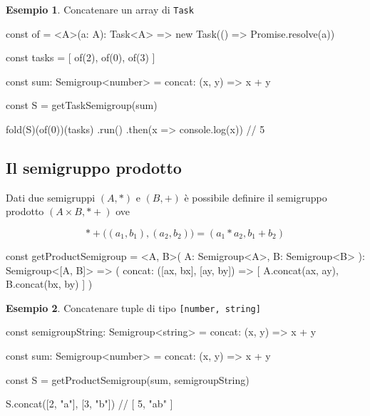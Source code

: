 \documentclass[12pt]{article}
\theoremstyle{definition}
\newtheorem{example}{Esempio}[section]
\newenvironment{code}
  {\vspace{0.5cm} \VerbatimEnvironment\begin{typescriptcode}}
  {\end{typescriptcode} \vspace{0.2cm}}
\begin{document}
\begin{example}
Concatenare un array di \texttt{Task}

\begin{code}
const of = <A>(a: A): Task<A> =>
  new Task(() => Promise.resolve(a))

const tasks = [
  of(2),
  of(0),
  of(3)
]

const sum: Semigroup<number> = {
  concat: (x, y) => x + y
}

const S = getTaskSemigroup(sum)

fold(S)(of(0))(tasks)
  .run()
  .then(x => console.log(x)) // 5
\end{code}
\end{example}

\subsection{Il semigruppo prodotto}

Dati due semigruppi $(A, *)$ e $(B, +)$ è possibile definire il semigruppo prodotto $(A \times B, *+)$ ove

$$
*+\Big((a_1, b_1), (a_2, b_2)\Big) = (a_1 * a_2, b_1 + b_2)
$$

\begin{code}
const getProductSemigroup = <A, B>(
  A: Semigroup<A>,
  B: Semigroup<B>
): Semigroup<[A, B]> => ({
  concat: ([ax, bx], [ay, by]) => [
    A.concat(ax, ay),
    B.concat(bx, by)
  ]
})
\end{code}

\begin{example}
Concatenare tuple di tipo \texttt{[number, string]}

\begin{code}
const semigroupString: Semigroup<string> = {
  concat: (x, y) => x + y
}

const sum: Semigroup<number> = {
  concat: (x, y) => x + y
}

const S = getProductSemigroup(sum, semigroupString)

S.concat([2, "a"], [3, "b"])
// [ 5, "ab" ]
\end{code}
\end{example}
\end{document}
